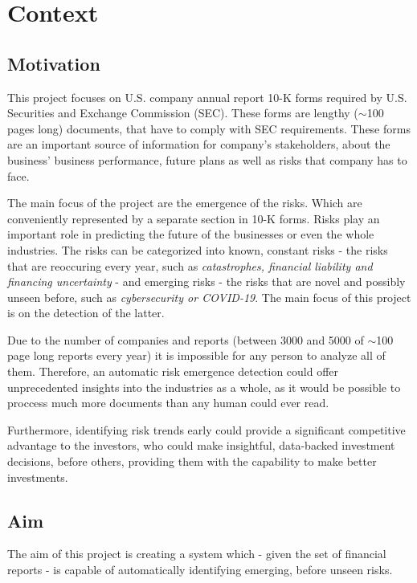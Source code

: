 \chapter{Context}

\section{Motivation}
This project focuses on U.S. company annual report 10-K forms required by U.S. Securities and Exchange Commission (SEC). These forms are lengthy ($\sim$100 pages long) documents, that have to comply with SEC requirements. These forms are an important source of information for company's stakeholders, about the business' business performance, future plans as well as risks that company has to face.

The main focus of the project are the emergence of the risks. Which are conveniently represented by a separate section in 10-K forms. Risks play an  important role in predicting the future of the businesses or even the whole industries. The risks can be categorized into known, constant risks - the risks that are reoccuring every year, such as \textit{catastrophes, financial liability and financing uncertainty} - and emerging risks - the risks that are novel and possibly unseen before, such as \textit{cybersecurity or COVID-19}. The main focus of this project is on the detection of the latter.

Due to the number of companies and reports (between 3000 and 5000 of $\sim$100 page long reports every year) it is impossible for any person to analyze all of them. Therefore, an automatic risk emergence detection could offer unprecedented insights into the industries as a whole, as it would be possible to proccess much more documents than any human could ever read.

Furthermore, identifying risk trends early could provide a significant competitive advantage to the investors, who could make insightful, data-backed investment decisions, before others, providing them with the capability to make better investments.

\section{Aim}
The aim of this project is creating a system which - given the set of financial reports - is capable of automatically identifying emerging, before unseen risks.

